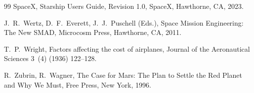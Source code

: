 \documentclass[preprint,12pt]{elsarticle}
\begin{document}
\begin{thebibliography}{99}
SpaceX,
\newblock Starship Users Guide, Revision 1.0,
\newblock SpaceX, Hawthorne, CA, 2023.

J.~R.~Wertz, D.~F.~Everett, J.~J.~Puschell (Eds.),
\newblock Space Mission Engineering: The New SMAD,
\newblock Microcosm Press, Hawthorne, CA, 2011.

T.~P.~Wright,
\newblock Factors affecting the cost of airplanes,
\newblock Journal of the Aeronautical Sciences 3~(4) (1936) 122--128.

R.~Zubrin, R.~Wagner,
\newblock The Case for Mars: The Plan to Settle the Red Planet and Why We Must,
\newblock Free Press, New York, 1996.

\end{thebibliography}
\end{document}
